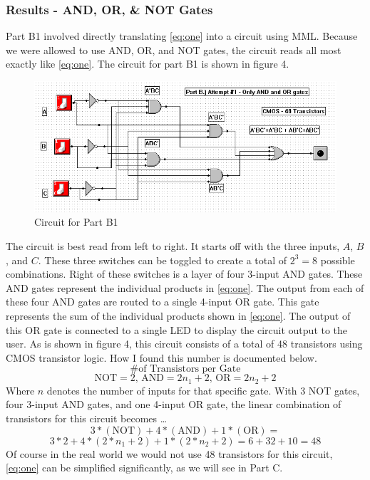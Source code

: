 \documentclass[a4paper,11pt]{article}
\begin{document}
\subsubsection{Results - AND, OR, \& NOT Gates} 
Part B1 involved directly translating \eqref{eq:one} into a circuit using MML. Because we were allowed to use AND, OR, and NOT gates, the circuit reads all most exactly like \eqref{eq:one}. The circuit for part B1 is shown in figure 4.

\begin{figure}[h!]
   \centering
     \includegraphics[width=6in]{PartB1Circuit}
   \caption{Circuit for Part B1}
   \label{fig:b1circuit}
\end{figure} 

The circuit is best read from left to right. It starts off with the three inputs, $A$, $B$, and $C$. These three switches can be toggled to create a total of $2^3 = 8$ possible combinations. Right of these switches is a layer of four 3-input AND gates. These AND gates represent the individual products in \eqref{eq:one}. The output from each of these four AND gates are routed to a single 4-input OR gate. This gate represents the sum of the individual products shown in \eqref{eq:one}. The output of this OR gate is connected to a single LED to display the circuit output to the user. As is shown in figure 4, this circuit consists of a total of 48 transistors using CMOS transistor logic. How I found this number is documented below.
\[ \text{\# of Transistors per Gate}\]
\[ \text{NOT} = 2 \text{, AND} = 2n_1+2 \text{, OR} = 2n_2+2 \]
Where $n$ denotes the number of inputs for that specific gate. With 3 NOT gates, four 3-input AND gates, and one 4-input OR gate, the linear combination of transistors for this circuit becomes \ldots
\[ 3*(\text{NOT})+4*(\text{AND})+1*(\text{OR}) = \]
\[ 3*2+4*(2*n_1+2)+1*(2*n_2+2) = 6+32+10 = 48\]
Of course in the real world we would not use 48 transistors for this circuit, \eqref{eq:one} can be simplified significantly, as we will see in Part C.
\par
\end{document}
